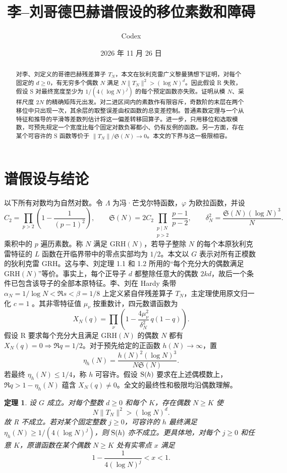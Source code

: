 \documentclass[UTF8,a4paper,11pt,fontset=fandol]{ctexart}
\title{\bfseries 李--刘哥德巴赫谱假设的移位素数和障碍}
\author{Codex}
\date{2026 年 11 月 26 日}
\newtheorem{theorem}{定理}
\newcommand{\Sg}{\mathfrak S}
\newcommand{\Lam}{\Lambda}
\newcommand{\GRH}{\mathrm{GRH}}
\begin{document}
\maketitle
\begin{abstract}
对李、刘定义的哥德巴赫残差算子 \(T_N\)，本文在狄利克雷广义黎曼猜想下证明，对每个固定的 \(d\ge0\)，有无穷多个偶数 \(N\) 满足
\(N\|T_N\|^2>(\log N)^d\)。因此假设 R 失败，假设 S 对最终宽度至少为 \(1/(4(\log N)^j)\) 的每个预定函数亦失败。证明从模 \(N\)、采样尺度 \(2N\) 的精确矩阵元出发。对二进区间内的素数作有限容斥，奇数阶的末层在两个移位中只出现一次，其余层的取整误差由权函数的总变差控制。普通素数定理与一个从特征和推导的平滑等差数列估计将这一偏差转移回算子。进一步，只用移位和选取模数，可预先规定一个宽度比每个固定对数负幂都小、仍有反例的函数。另一方面，存在某个可容许的 S 函数等价于 \(\|T_N\|/\Sg(N)\to0\)。本文的下界与这一极限相容。
\end{abstract}

\section{谱假设与结论}
以下所有对数均为自然对数。令 \(\Lam\) 为冯·芒戈尔特函数，\(\varphi\) 为欧拉函数，并设
\[
 C_2=\prod_{p>2}\left(1-\frac1{(p-1)^2}\right),\qquad
 \Sg(N)=2C_2\prod_{\substack{p\mid N\\p>2}}\frac{p-1}{p-2},
 \qquad \delta_N^2=\frac{\Sg(N)(\log N)^3}{N}.
\]
乘积中的 \(p\) 遍历素数。称 \(N\) 满足 \(\GRH(N)\)，若导子整除 \(N\) 的每个本原狄利克雷特征的 \(L\) 函数在开临界带中的零点实部均为 \(1/2\)。本文以 \(G\) 表示对所有正模数的狄利克雷 GRH。这与李、刘定理 1.1 和 1.2 所用的“每个充分大的偶数满足 \(\GRH(N)\)”等价。事实上，每个正导子 \(d\) 都整除任意大的偶数 \(2kd\)，故后一个条件已包含该导子的全部本原特征。李、刘在 Hardy 条带 \(\alpha_N=1/\log N<\Re s<\beta=1/8\) 上定义紧自伴残差算子 \(T_N\)，主定理使用原文归一化 \(c=1\) \cite{LL}。其非零特征值 \(\mu_\nu\) 按重数计，四元数谱函数为
\[
 X_N(q)=\prod_\nu\left(1-\frac{4\mu_\nu^2}{\delta_N^2}\,q(1-q)\right).
\]
假设 R 要求每个充分大且满足 \(\GRH(N)\) 的偶数 \(N\) 都有 \(X_N(q)=0\Rightarrow\Re q=1/2\)。对于预先给定的正函数 \(h(N)\to\infty\)，置
\[
 \eta_h(N)=\frac{h(N)^2(\log N)^3}{N\Sg(N)} .
\]
若最终 \(\eta_h(N)\le1/4\)，称 \(h\) 可容许。假设 \({\rm S}(h)\) 要求在上述偶模数上，\(\Re q>1-\eta_h(N)\) 蕴含 \(X_N(q)\ne0\)。全文的最终性和极限均沿偶数理解。

\begin{theorem}\label{th:main}
设 \(G\) 成立。对每个整数 \(d\ge0\) 和每个 \(K\)，存在偶数 \(N\ge K\) 使
\[
                    N\|T_N\|^2>(\log N)^d.                  \tag{1}
\]
故 R 不成立。若对某个固定整数 \(j\ge0\)，可容许的 \(h\) 最终满足
\(\eta_h(N)\ge 1/(4(\log N)^j)\)，则 \({\rm S}(h)\) 亦不成立。更具体地，对每个 \(j\ge0\) 和任意 \(K\)，原谱函数在某个偶数 \(N\ge K\) 处有实零点 \(x\) 满足
\[
            1-\frac{1}{4(\log N)^j}<x<1.
\]
\end{theorem}
\end{document}
